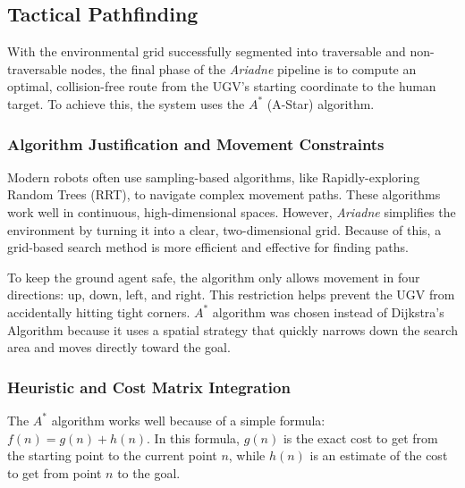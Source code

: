 \documentclass[12pt, a4paper]{article}
\begin{document}
\newpage

\subsection{Tactical Pathfinding}

\quad With the environmental grid successfully segmented into traversable and non-traversable nodes, the final phase of the \textit{Ariadne} pipeline is to compute an optimal, collision-free route from the UGV's starting coordinate to the human target. To achieve this, the system uses the $A^*$ (A-Star) algorithm.

\vspace{0.5cm}

\subsubsection{Algorithm Justification and Movement Constraints}

\quad Modern robots often use sampling-based algorithms, like Rapidly-exploring Random Trees (RRT), to navigate complex movement paths. These algorithms work well in continuous, high-dimensional spaces. However, \textit{Ariadne} simplifies the environment by turning it into a clear, two-dimensional grid. Because of this, a grid-based search method is more efficient and effective for finding paths.

\vspace{0.5cm}

To keep the ground agent safe, the algorithm only allows movement in four directions: up, down, left, and right. This restriction helps prevent the UGV from accidentally hitting tight corners. $A^*$ algorithm was chosen instead of Dijkstra’s Algorithm because it uses a spatial strategy that quickly narrows down the search area and moves directly toward the goal.

\vspace{0.5cm}

\subsubsection{Heuristic and Cost Matrix Integration}

\quad The $A^*$ algorithm works well because of a simple formula: $f(n) = g(n) + h(n)$. In this formula, $g(n)$ is the exact cost to get from the starting point to the current point $n$, while $h(n)$ is an estimate of the cost to get from point $n$ to the goal.
\end{document}
